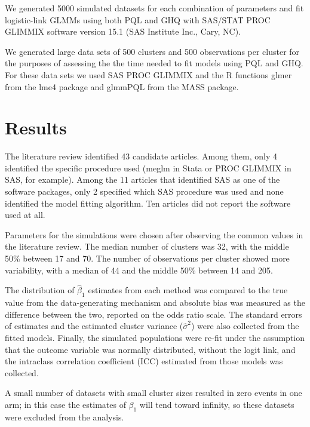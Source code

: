 \documentclass[Afour,times,sagev,doublespace]{sagej}
\begin{document}
We generated 5000 simulated datasets for each combination of parameters and fit logistic-link GLMMs using both PQL and GHQ with SAS/STAT PROC GLIMMIX software version 15.1 (SAS Institute Inc., Cary, NC).

We generated large data sets of 500 clusters and 500 observations per cluster for the purposes of assessing the the time needed to fit models using PQL and GHQ.  For these data sets we used SAS PROC GLIMMIX and the R functions glmer from the lme4 package and glmmPQL from the MASS package.






\section{Results}

The literature review identified 43 candidate articles. Among them, only 4 identified the specific procedure used (meglm in Stata or PROC GLIMMIX in SAS, for example). Among the 11 articles that identified SAS as one of the software packages, only 2 specified which SAS procedure was used and none identified the model fitting algorithm. Ten articles did not report the software used at all.

Parameters for the simulations were chosen after observing the common values in the literature review. The median number of clusters was 32, with the middle 50\% between 17 and 70. The number of observations per cluster showed more variability, with a median of 44 and the middle 50\% between 14 and 205.


The distribution of $\hat{\beta}_1$ estimates from each method was compared to the true value from the data-generating mechanism and absolute bias was measured as the difference between the two, reported on the odds ratio scale. The standard errors of estimates and the estimated cluster variance ($\hat{\sigma}^2$) were also collected from the fitted models. Finally, the simulated populations were re-fit under the assumption that the outcome variable was normally distributed, without the logit link, and the intraclass correlation coefficient (ICC) estimated from those models was collected.

A small number of datasets with small cluster sizes resulted in zero events in one arm; in this case the estimates of $\beta_1$ will tend toward infinity, so these datasets were excluded from the analysis.
\end{document}
